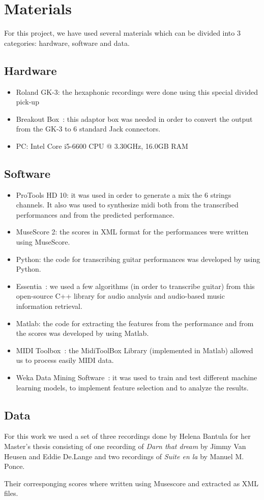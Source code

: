 \chapter{Materials}
\label{chap:materials}
For this project, we have used several materials which can be divided into 3 categories: hardware, software and data.

\section*{Hardware}
\begin{itemize}[noitemsep]
\item Roland GK-3: the hexaphonic recordings were done using this special divided pick-up
\item Breakout Box~\cite{OGrady2009}: this adaptor box was needed in order to convert the output from the GK-3 to 6 standard Jack connectors.
\item PC: Intel Core i5-6600 CPU @ 3.30GHz, 16.0GB RAM
\end{itemize}

\section*{Software}
\begin{itemize}[noitemsep]
\item ProTools HD 10: it was used in order to generate a mix the 6 strings channels. It also was used to synthesize midi both from the transcribed performances and from the predicted performance.
\item MuseScore 2: the scores in XML format for the performances were written using MuseScore.
\item Python: the code for transcribing guitar performances was developed by using Python.
\item Essentia~\cite{bogdanov2013essentia}: we used a few algorithms (in order to transcribe guitar) from this open-source C++ library for audio analysis and audio-based music information retrieval.
\item Matlab: the code for extracting the features from the performance and from the scores was developed by using Matlab.
\item MIDI Toolbox~\cite{eerola2004midi}: the MidiToolBox Library (implemented in Matlab) allowed us to process easily MIDI data.
\item Weka Data Mining Software~\cite{hall2009weka}: it was used to train and test different machine learning models, to implement feature selection and to analyze the results.
\end{itemize}

\section*{Data}
For this work we used a set of three recordings done by Helena Bantula for her Master's thesis consisting of one recording of \textit{Darn that dream} by Jimmy Van Heusen and Eddie De.Lange and two recordings of \textit{Suite en la} by Manuel M. Ponce.

Their corresponging scores where written using Musescore and extracted as XML files.

\cleardoublepage